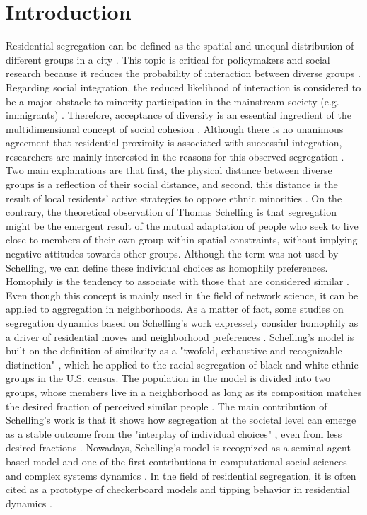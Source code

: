 \documentclass{ws-acs}
\begin{document}
\section{Introduction}
Residential segregation can be defined as the spatial and unequal distribution of different groups in a city \cite{clark2015}. This topic is critical for policymakers and social research because it reduces the probability of interaction between diverse groups \cite{massey88}. Regarding social integration, the reduced likelihood of interaction is considered to be a major obstacle to minority participation in the mainstream society (e.g. immigrants) \cite{Esser2010}. Therefore, acceptance of diversity is an essential ingredient of the multidimensional concept of social cohesion \cite{DragolovIgnaczea2016SocialCohesionin}. Although there is no unanimous agreement that residential proximity is associated with successful integration, researchers are mainly interested in the reasons for this observed segregation \cite{bolt2010}. Two main explanations are that first, the physical distance between diverse groups is a reflection of their social distance, and second, this distance is the result of local residents' active strategies to oppose ethnic minorities \cite{clark2008, bruch2014}. On the contrary, the theoretical observation of Thomas Schelling \cite{schelling69} is that segregation might  be the emergent result of the mutual adaptation of people who seek to live close to members of their own group within spatial constraints, without implying negative attitudes towards other groups. Although the term was not used by Schelling, we can define these individual choices as homophily preferences. Homophily is the tendency to associate with those that are considered similar \cite{mcpherson2001}. Even though this concept is mainly used in the field of network science, it can be applied to aggregation in neighborhoods. As a matter of fact, some studies on segregation dynamics based on Schelling's work expressely consider homophily as a driver of residential moves and neighborhood preferences \cite{muller2018, magi2016}. Schelling's model is built on the definition of similarity as a "twofold, exhaustive and recognizable distinction" \cite{schelling69 p.488}, which he applied to the racial segregation of black and white ethnic groups in the U.S. census. The population in the model is divided into two groups, whose members live in a neighborhood as long as its composition matches the desired fraction of perceived similar people \cite{schelling69, schelling71}. The main contribution of Schelling's work is that it shows how segregation at the societal level can emerge as a stable outcome from the "interplay of individual choices" \cite[p.~488]{schelling69}, even from less desired fractions \cite{schelling69, schelling71}. Nowadays, Schelling's model is recognized as a seminal agent-based model \cite{hatna2015} and one of the first contributions in computational social sciences and complex systems dynamics \cite{epstein1996}. In the field of residential segregation, it is often cited as a prototype of checkerboard models \cite{zhang2011} and tipping behavior in residential dynamics \cite{card2008}.
\end{document}
